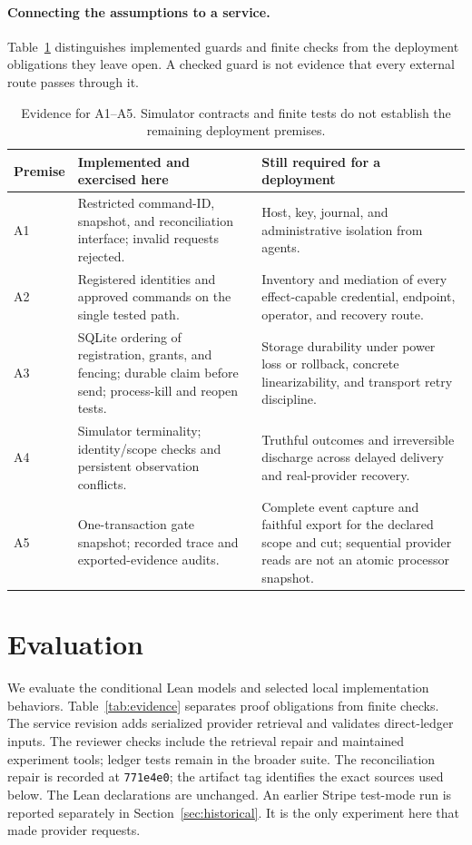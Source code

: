 \documentclass[11pt]{article}
\newcommand{\code}[1]{\texttt{\small #1}}
\begin{document}
\paragraph{Connecting the assumptions to a service.}
Table~\ref{tab:assumption_evidence} distinguishes implemented guards and finite
checks from the deployment obligations they leave open. A checked guard is
not evidence that every external route passes through it.

\begin{table}[ht]
\centering\small
\begin{tabularx}{\linewidth}{@{}l >{\raggedright\arraybackslash}X >{\raggedright\arraybackslash}X@{}}
\toprule
Premise & Implemented and exercised here & Still required for a deployment \\
\midrule
A1 & Restricted command-ID, snapshot, and reconciliation interface; invalid requests rejected. & Host, key, journal, and administrative isolation from agents. \\
A2 & Registered identities and approved commands on the single tested path. & Inventory and mediation of every effect-capable credential, endpoint, operator, and recovery route. \\
A3 & SQLite ordering of registration, grants, and fencing; durable claim before send; process-kill and reopen tests. & Storage durability under power loss or rollback, concrete linearizability, and transport retry discipline. \\
A4 & Simulator terminality; identity/scope checks and persistent observation conflicts. & Truthful outcomes and irreversible discharge across delayed delivery and real-provider recovery. \\
A5 & One-transaction gate snapshot; recorded trace and exported-evidence audits. & Complete event capture and faithful export for the declared scope and cut; sequential provider reads are not an atomic processor snapshot. \\
\bottomrule
\end{tabularx}
\caption{Evidence for A1--A5. Simulator contracts and finite tests do not
establish the remaining deployment premises.}
\label{tab:assumption_evidence}
\end{table}

\section{Evaluation}
\label{sec:eval}
We evaluate the conditional Lean models and selected local implementation
behaviors. Table~\ref{tab:evidence} separates proof obligations from finite
checks. The service revision adds serialized provider retrieval and validates
direct-ledger inputs. The reviewer checks include the retrieval
repair and maintained experiment tools; ledger tests remain in the broader suite.
The reconciliation repair is recorded at \code{771e4e0}; the artifact tag
identifies the exact sources used below. The Lean declarations are unchanged.
An earlier Stripe test-mode run is reported separately in
Section~\ref{sec:historical}. It is the only experiment here that made provider
requests.
\end{document}
